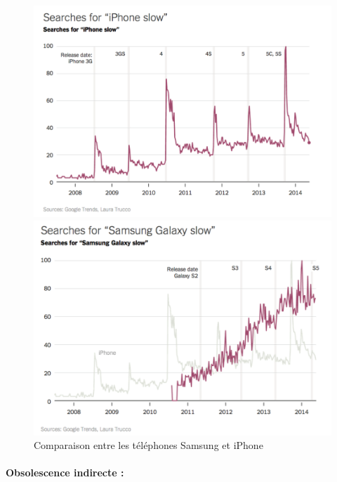 \begin{figure}[h]

\begin{minipage}{0.5\linewidth}
\includegraphics[scale=0.25]{Rsc/searchForIphoneSlow.png} 
\end{minipage}
\begin{minipage}{0.5\linewidth}
\includegraphics[scale=0.25]{Rsc/searchForSamsungSlow.png} 
\end{minipage}
\caption{Comparaison entre les téléphones Samsung et iPhone}
\label{compSamsIph}
\end{figure}

\paragraph*{Obsolescence indirecte :}

